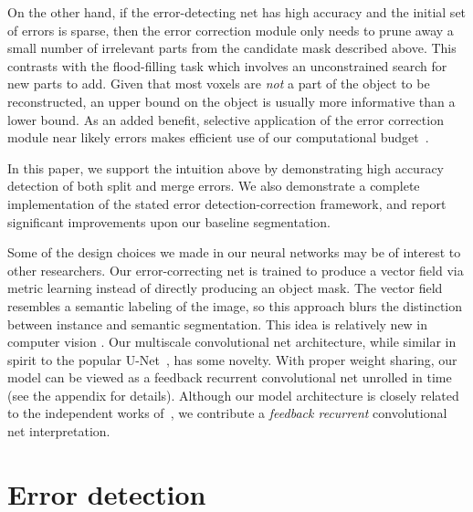 \documentclass{article}
\begin{document}
On the other hand, if the error-detecting net has high accuracy and the initial set of errors is sparse, then the error correction module only needs to prune away a small number of irrelevant parts from the candidate mask described above. This contrasts with the flood-filling task which involves an unconstrained search for new parts to add. Given that most voxels are \textit{not} a part of the object to be reconstructed, an upper bound on the object is usually more informative than a lower bound. As an added benefit, selective application of the error correction module near likely errors makes efficient use of our computational budget~\cite{multipass}.

In this paper, we support the intuition above by demonstrating high accuracy detection of both split and merge errors. We also demonstrate a complete implementation of the stated error detection-correction framework, and report significant improvements upon our baseline segmentation.


Some of the design choices we made in our neural networks may be of interest to
other researchers. Our error-correcting net is trained to produce a vector field
via metric learning instead of directly producing an object mask. The vector
field resembles a semantic labeling of the image, so this approach blurs the
distinction between instance and semantic segmentation. This idea is relatively
new in computer vision
\cite{harley2015metric,fathi2017metric,brabandere2017metric}. Our multiscale
convolutional net architecture, while similar in spirit to the popular
U-Net~\cite{unet}, has some novelty. With proper weight sharing, our model can
be viewed as a feedback recurrent convolutional net unrolled in time (see the
appendix for details). Although our model architecture is closely related to the
independent works of~\cite{neuralfabric,mdnet,gridnet}, we contribute a
\emph{feedback recurrent} convolutional net interpretation.

\section{Error detection}
\end{document}
